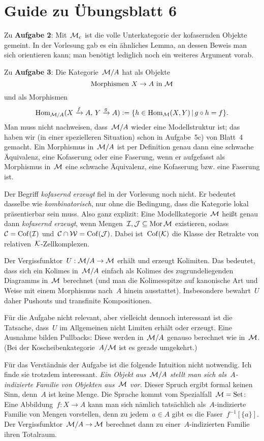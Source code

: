 \documentclass{uebblatt}
\begin{document}
\section*{Guide zu Übungsblatt 6}

Zu \textbf{Aufgabe 2}: Mit~$\mathcal{M}_c$ ist die volle Unterkategorie der kofasernden
Objekte gemeint. In der Vorlesung gab es ein ähnliches Lemma, an dessen Beweis
man sich orientieren kann; man benötigt lediglich noch ein weiteres Argument
vorab.

Zu \textbf{Aufgabe 3}: Die Kategorie~$\mathcal{M}/A$ hat als Objekte
\[ \text{Morphismen~$X \to A$ in~$\mathcal{M}$} \]
und als Morphismen
\[ \mathrm{Hom}_{\mathcal{M}/A}(X \xrightarrow{f} A,\, Y \xrightarrow{g} A) \vcentcolon= \{ h \in \mathrm{Hom}_{\mathcal{M}}(X,Y) \,|\,
  g \circ h = f \}. \]
Man muss nicht nachweisen, dass~$\mathcal{M}/A$ wieder eine Modellstruktur ist; das
haben wir (in einer spezielleren Situation) schon in Aufgabe~5c) von Blatt~4
gemacht. Ein Morphismus in~$\mathcal{M}/A$ ist per Definition genau dann eine schwache
Äquivalenz, eine Kofaserung oder eine Faserung, wenn er aufgefasst als
Morphismus in~$\mathcal{M}$ eine schwache Äquivalenz, eine Kofaserung bzw. eine Faserung
ist.

Der Begriff \emph{kofasernd erzeugt} fiel in der Vorlesung noch nicht. Er
bedeutet dasselbe wie \emph{kombinatorisch}, nur ohne die Bedingung, dass die
Kategorie lokal präsentierbar sein muss. Also ganz explizit: Eine
Modellkategorie~$\mathcal{M}$ heißt genau dann \emph{kofasernd erzeugt}, wenn
Mengen~$\mathcal{I}, \mathcal{J} \subseteq \operatorname{Mor} \mathcal{M}$ existieren, sodass~$\mathcal{C} = \mathrm{Cof}(\mathcal{I})$ und~$\mathcal{C} \cap
\mathcal{W} = \mathrm{Cof}(\mathcal{J})$. Dabei ist~$\mathrm{Cof}(\mathcal{K})$ die Klasse der Retrakte von
relativen~$\mathcal{K}$-Zellkomplexen.

Der Vergissfunktor~$U : \mathcal{M}/A \to \mathcal{M}$ erhält und erzeugt Kolimiten. Das
bedeutet, dass sich ein Kolimes in~$\mathcal{M}/A$ einfach als Kolimes des
zugrundeliegenden Diagramms in~$\mathcal{M}$ berechnet (und man die Kolimesspitze auf
kanonische Art und Weise mit einem Morphismus nach~$A$ hinein ausstattet).
Insbesondere bewahrt~$U$ daher Pushouts und transfinite Kompositionen.

Für die Aufgabe nicht relevant, aber vielleicht dennoch interessant ist die
Tatsache, dass~$U$ im Allgemeinen nicht Limiten erhält oder erzeugt. Eine
Ausnahme bilden Pullbacks: Diese werden in~$\mathcal{M}/A$ genauso berechnet wie
in~$\mathcal{M}$. (Bei der Koscheibenkategorie~$A/\mathcal{M}$ ist es gerade umgekehrt.)

Für das Verständnis der Aufgabe ist die folgende Intuition nicht notwendig. Ich
finde sie trotzdem interessant. \emph{Ein Objekt aus~$\mathcal{M}/A$ stellt man sich
als~$A$-indizierte Familie von Objekten aus~$\mathcal{M}$ vor.} Dieser Spruch ergibt formal
keinen Sinn, denn~$A$ ist keine Menge. Die Sprache kommt vom Spezialfall~$\mathcal{M} =
\mathrm{Set}$: Eine Abbildung~$f : X \to A$ kann man sich nämlich tatsächlich
als~$A$-indizierte Familie von Mengen vorstellen, denn zu jedem~$a \in A$ gibt
es die Faser~$f^{-1}[\{a\}]$. Der Vergissfunktor~$\mathcal{M}/A \to \mathcal{M}$ berechnet dann
zu einer~$A$-indizierten Familie ihren Totalraum.
\end{document}
